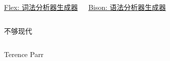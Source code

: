 \begin{frame}{}
  \begin{columns}
      \begin{center}
        \href{https://en.wikipedia.org/wiki/Flex_(lexical_analyser_generator)}{Flex: 词法分析器生成器}
      \end{center}
      \begin{center}
        \href{https://en.wikipedia.org/wiki/GNU_Bison}{Bison: 语法分析器生成器}
      \end{center}
  \end{columns}

  \pause
  \vspace{0.50cm}
  \begin{center}
    不够现代
  \end{center}
\end{frame}

\begin{frame}{}
  \begin{columns}
      \begin{center}
        Terence Parr
      \end{center}
  \end{columns}

  \vspace{0.80cm}
  \begin{center}
  \end{center}
\end{frame}

\begin{frame}{}
  \begin{columns}
  \end{columns}
\end{frame}
